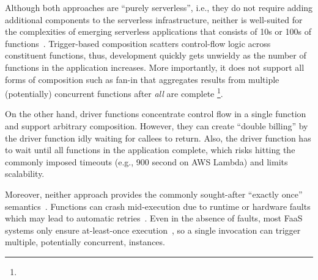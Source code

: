 Although both approaches are ``purely serverless'', i.e., they do not require
adding additional components to the serverless infrastructure, neither is
well-suited for the complexities of emerging serverless applications that
consists of 10s or 100s of functions~\cite{excamera, hello-retail}.
Trigger-based composition scatters control-flow logic across constituent
functions, thus, development quickly gets unwieldy as the number of functions in the
application increases. More importantly, it does not support all forms of
composition such as fan-in that aggregates results from multiple (potentially)
concurrent functions after \textit{all} are complete \footnote{}.


On the other hand, driver functions concentrate control flow in a single
function and support arbitrary composition. However, they can  create ``double
billing'' by the driver function idly waiting for callees to return. Also, the
driver function has to wait until all functions in the application complete,
which risks hitting the commonly imposed timeouts (e.g., 900 second on AWS
Lambda) and limits scalability.


Moreover, neither approach provides the commonly sought-after ``exactly once''
semantics~\cite{netherite, beldi, boki, formal-foundation-exec-gtnee}.
Functions can crash mid-execution due to runtime or hardware faults which may
lead to automatic retries~\cite{aws-lambda-retry, azure-functions-retry}. Even
in the absence of faults, most FaaS systems only ensure at-least-once
execution~\cite{aws-lambda-async-invoke, azure-functions-exec-guarantee}, so a
single invocation can trigger multiple, potentially concurrent, instances.





